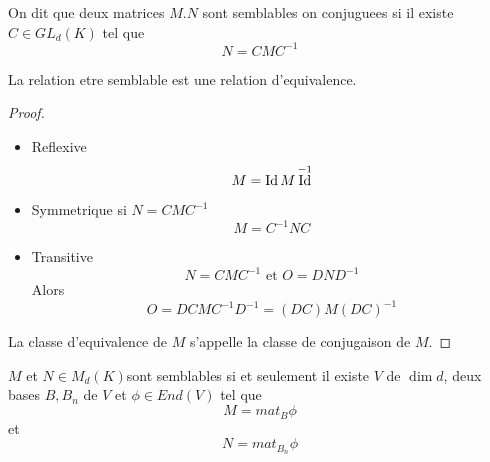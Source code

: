 \documentclass[../main.tex]{subfiles}
\begin{document}
\begin{defn}
	On dit que deux matrices $M.N$ sont semblables on conjuguees si il existe $C \in GL_d( K) $ tel que
	\[ 
	N= CMC^{-1}
	\]
	
\end{defn}
\begin{propo}
La relation etre semblable est une relation d'equivalence.
\end{propo}
\begin{proof}
\begin{itemize}
\item Reflexive
	\[ 
	M= \operatorname*{Id} M\operatorname*{Id}^{-1}
	\]

\item Symmetrique si $N= CMC^{-1}$ 
	\[ 
	M= C^{-1}NC
	\]

\item Transitive
	\[ 
	N= CMC^{-1} \text{ et } O = DND^{-1}
	\]
	Alors
	\[ 
		O= DCMC^{-1}D^{-1} = ( DC) M ( DC) ^{-1}
	\]
	
	
\end{itemize}
La classe d'equivalence de $M$ s'appelle la classe de conjugaison de $M$.

\end{proof}
\begin{rmq}
	$M$ et $N \in M_d( K) $sont semblables si et seulement il existe $V$ de $\dim d$, deux bases $B,B_n$ de $V$ et $\phi \in End( V) $ tel que
	\[ 
	M= mat_B \phi
	\]
	et 
	\[ 
		N= mat_{B_n} \phi
	\]
	
\end{rmq}












	
\end{document}
